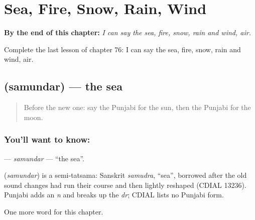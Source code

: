 
\chapter{Sea, Fire, Snow, Rain, Wind}
\label{ch:pa-sea-fire-snow-rain-wind}

\begin{chapteropening}
\textbf{By the end of this chapter:} \emph{I can say the sea, fire, snow, rain and wind, air.}

Complete the last lesson of chapter 76: I can say the sea, fire, snow, rain and wind, air.
\end{chapteropening}

\section[\texorpdfstring{\pa{ਸਮੁੰਦਰ} (samundar)}{ਸਮੁੰਦਰ (samundar)}]{ (samundar) — the sea}

\label{lesson:PA-C76-samundar}



\begin{quote}
Before the new one: say the Punjabi for the sun, then the Punjabi for the moon.
\end{quote}

\subsection*{You'll want to know: }
\textbf{} — \emph{samundar} — \textquotedblleft{}the sea\textquotedblright{}.

\begin{cousinweb}
\textbf{} (\emph{samundar}) is a semi-tatsama: Sanskrit \emph{samudra}, \textquotedblleft{}sea\textquotedblright{}, borrowed after the old sound changes had run their course and then lightly reshaped (CDIAL 13236). Punjabi adds an \emph{n} and breaks up the \emph{dr}; CDIAL lists no Punjabi form.
\end{cousinweb}

\begin{grammarlens}[title={What you've built}]
One more word for this chapter.
\end{grammarlens}

